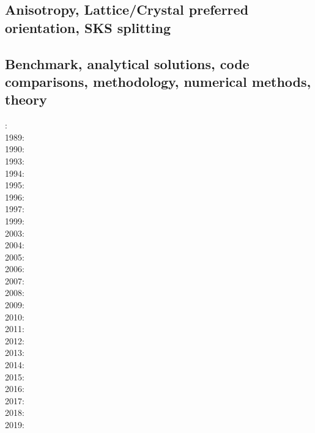 \subsection{Anisotropy, Lattice/Crystal preferred orientation, SKS splitting}

\cite{faca13}
\cite{facc14}

\subsection*{Benchmark, analytical solutions, code comparisons, methodology, numerical methods, theory}

: \cite{yusa84}\\
1989: \cite{blbc89}\\
1990: \cite{trab90}\\
1993: \cite{leka93}\\
1994: \cite{brsa94}\\
1995: \cite{brsa95}\cite{moso95}\cite{full95}\\
1996: \cite{zhon96}\cite{mozg96}\\
1997: \cite{rist97}\\
1999: \cite{lind99}\\
2003: \cite{taki03}\cite{modm03}\cite{geyu03}\\
2004: \cite{kaps04}\cite{kasa04}\cite{kaks08}\\
2005: \cite{mure05}\\
2006: \cite{kapo06}\cite{more06}\\
2007: \cite{toma07}\cite{chcc07}\cite{kabe07}\cite{kaks07}\cite{moql07}\cite{geyu07}\\
2008: \cite{zhmt08}\cite{deka08}\cite{trub08}\cite{krdp08}\cite{mamo08}\cite{gepd98}\cite{vack08}\\
2009: \cite{king09}\cite{geum09}\\
2010: \cite{kaus10}\cite{kamm10}\cite{egat10}\cite{kilv10}\\
2011: \cite{dumg11}\cite{uibb11}\cite{hegc11}\\
2012: \cite{crsg12}\cite{chgv12}\cite{krwd12}\cite{may12}\cite{gerb12}\\
2013: \cite{chtl13}\cite{kemk13}\cite{gemd13}\\
2014: \cite{thmk14}\cite{mabl14}\\
2015: \cite{lelk15}\cite{rumi15}\cite{chpe15}\cite{mabl15}\\
2016: \cite{dumy16}\cite{blmp16}\\
2017: \cite{robh17}\cite{wisv17}\\
2018: \cite{memm18}\\
2019: \cite{clhe19}\cite{liki19}

